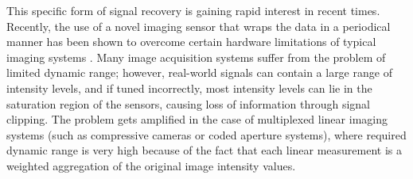 
This specific form of signal recovery is gaining rapid interest in recent times. Recently, the use of a novel imaging sensor that wraps the data in a periodical manner has been shown to overcome certain hardware limitations of typical imaging systems \cite{Bhandari,ICCP15_Zhao,Shah,Cucuringu2017}. Many image acquisition systems suffer from the problem of limited dynamic range; however, real-world signals can contain a large range of intensity levels, and if tuned incorrectly, most intensity levels can lie in the saturation region of the sensors, causing loss of information through signal clipping. The problem gets amplified in the case of multiplexed linear imaging systems (such as compressive cameras or coded aperture systems), where required dynamic range is very high because of the fact that each linear measurement is a weighted aggregation of the original image intensity values. 


